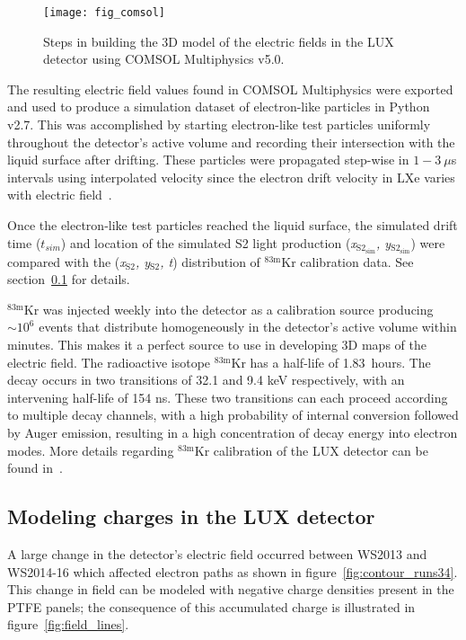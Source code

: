 \documentclass[11pt,a4paper]{article}
\newcommand{\isot}[2]{$^{\textrm{#2}}$#1 }
\newcommand{\krm}{\isot{Kr}{83m}}
\newcommand{\subStwo}{$_{\textrm{S2}}$}
\begin{document}
\begin{figure}[ht!]
\begin{center}
\texttt{[image: fig\_comsol]}
\caption{Steps in building the 3D model of the electric fields in the LUX detector using \textsc{COMSOL} Multiphysics v5.0.}
\label{fig:comsol}
\end{center} 
\end{figure}

The resulting electric field values found in \textsc{COMSOL} Multiphysics were exported and used to produce a simulation dataset of electron-like particles in Python v2.7. This was accomplished by starting electron-like test particles uniformly throughout the detector's active volume and recording their intersection with the liquid surface after drifting. These particles were propagated step-wise in $1-3~\mu$s intervals using interpolated velocity since the electron drift velocity in LXe varies with electric field~\cite{Albert:2016bhh}. 

Once the electron-like test particles reached the liquid surface, the simulated drift time ($t_{sim}$) and location of the simulated S2 light production (\textit{x$_{\textrm{S2}_\textrm{sim}}$, y$_{\textrm{S2}_\textrm{sim}}$}) were compared with the (\textit{x\subStwo, y\subStwo, t}) distribution of \krm calibration data. See section~\ref{sub:charge_modeling} for details.

\krm was injected weekly into the detector as a calibration source producing $\sim10^{6}$ events that distribute homogeneously in the detector's active volume within minutes. This makes it a perfect source to use in developing 3D maps of the electric field. The radioactive isotope \krm has a half-life of 1.83~hours. The decay occurs in two transitions of 32.1 and 9.4 keV respectively, with an intervening half-life of 154 ns. These two transitions can each proceed according to multiple decay channels, with a high probability of internal conversion followed by Auger emission, resulting in a high concentration of decay energy into electron modes. More details regarding \krm calibration of the LUX detector can be found in~\cite{scott_krm}.

\subsection{Modeling charges in the LUX detector}\label{sub:charge_modeling}
A large change in the detector's electric field occurred between WS2013 and WS2014-16 which affected electron paths as shown in figure~\ref{fig:contour_runs34}. This change in field can be modeled with negative charge densities present in the PTFE panels; the consequence of this accumulated charge is illustrated in figure~\ref{fig:field_lines}.
\end{document}

